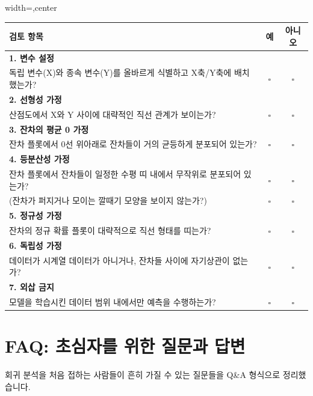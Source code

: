 \documentclass[11pt,a4paper]{book}
\theoremstyle{definition}
\begin{document}
\begin{adjustbox}{width=\textwidth,center}
\begin{tabular}{p{}cc}
\toprule
\textbf{검토 항목} & \textbf{예} & \textbf{아니오} \\
\midrule
\textbf{1. 변수 설정} & & \\
\quad 독립 변수(X)와 종속 변수(Y)를 올바르게 식별하고 X축/Y축에 배치했는가? & $\square$ & $\square$ \\
\textbf{2. 선형성 가정} & & \\
\quad 산점도에서 X와 Y 사이에 대략적인 직선 관계가 보이는가? & $\square$ & $\square$ \\
\textbf{3. 잔차의 평균 0 가정} & & \\
\quad 잔차 플롯에서 0선 위아래로 잔차들이 거의 균등하게 분포되어 있는가? & $\square$ & $\square$ \\
\textbf{4. 등분산성 가정} & & \\
\quad 잔차 플롯에서 잔차들이 일정한 수평 띠 내에서 무작위로 분포되어 있는가? & $\square$ & $\square$ \\
\quad (잔차가 퍼지거나 모이는 깔때기 모양을 보이지 않는가?) & $\square$ & $\square$ \\
\textbf{5. 정규성 가정} & & \\
\quad 잔차의 정규 확률 플롯이 대략적으로 직선 형태를 띠는가? & $\square$ & $\square$ \\
\textbf{6. 독립성 가정} & & \\
\quad 데이터가 시계열 데이터가 아니거나, 잔차들 사이에 자기상관이 없는가? & $\square$ & $\square$ \\
\textbf{7. 외삽 금지} & & \\
\quad 모델을 학습시킨 데이터 범위 내에서만 예측을 수행하는가? & $\square$ & $\square$ \\
\bottomrule
\end{tabular}
\end{adjustbox}


\section{FAQ: 초심자를 위한 질문과 답변}
회귀 분석을 처음 접하는 사람들이 흔히 가질 수 있는 질문들을 Q\&A 형식으로 정리했습니다.
\end{document}
